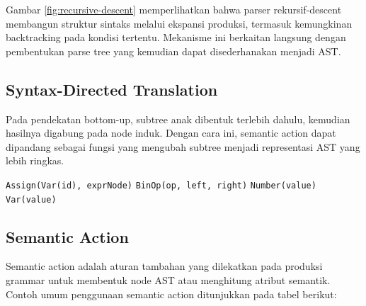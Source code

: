 Gambar \ref{fig:recursive-descent} memperlihatkan bahwa parser rekursif-descent membangun struktur sintaks melalui ekspansi produksi, termasuk kemungkinan backtracking pada kondisi tertentu. Mekanisme ini berkaitan langsung dengan pembentukan parse tree yang kemudian dapat disederhanakan menjadi AST.

\subsection{Syntax-Directed Translation}
Pada pendekatan bottom-up, subtree anak dibentuk terlebih dahulu, kemudian hasilnya digabung pada node induk. Dengan cara ini, semantic action dapat dipandang sebagai fungsi yang mengubah subtree menjadi representasi AST yang lebih ringkas.

\begin{breakablealgorithm}
    \label{alg:parse-to-ast}
    \begin{algorithmic}[1]
        \State \Return \texttt{Assign(Var(id), exprNode)}
        \EndProcedure
        \State \Return \texttt{BinOp(op, left, right)}
        \EndProcedure
        \State \Return \texttt{Number(value)}
        \State \Return \texttt{Var(value)}
        \EndIf
        \EndProcedure
    \end{algorithmic}
\end{breakablealgorithm}

\subsection{Semantic Action}
Semantic action adalah aturan tambahan yang dilekatkan pada produksi grammar untuk membentuk node AST atau menghitung atribut semantik. Contoh umum penggunaan semantic action ditunjukkan pada tabel berikut:

